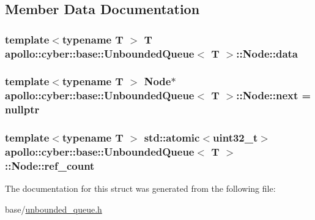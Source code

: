 \subsection{Member Data Documentation}
\hypertarget{structapollo_1_1cyber_1_1base_1_1UnboundedQueue_1_1Node_a9bc7d18c73019f923588336f91cba5df}{
\subsubsection[{data}]{\setlength{\rightskip}{0pt plus 5cm}template$<$typename T $>$ T {\bf apollo\-::cyber\-::base\-::\-Unbounded\-Queue}$<$ T $>$\-::Node\-::data}}\label{structapollo_1_1cyber_1_1base_1_1UnboundedQueue_1_1Node_a9bc7d18c73019f923588336f91cba5df}
\hypertarget{structapollo_1_1cyber_1_1base_1_1UnboundedQueue_1_1Node_a9431bfb8cc5ff8be4870a1456f36f8c3}{
\subsubsection[{next}]{\setlength{\rightskip}{0pt plus 5cm}template$<$typename T $>$ {\bf Node}$\ast$ {\bf apollo\-::cyber\-::base\-::\-Unbounded\-Queue}$<$ T $>$\-::Node\-::next = nullptr}}\label{structapollo_1_1cyber_1_1base_1_1UnboundedQueue_1_1Node_a9431bfb8cc5ff8be4870a1456f36f8c3}
\hypertarget{structapollo_1_1cyber_1_1base_1_1UnboundedQueue_1_1Node_a083b6184f84c240769267e0823b34d89}{
\subsubsection[{ref\-\_\-count}]{\setlength{\rightskip}{0pt plus 5cm}template$<$typename T $>$ std\-::atomic$<$uint32\-\_\-t$>$ {\bf apollo\-::cyber\-::base\-::\-Unbounded\-Queue}$<$ T $>$\-::Node\-::ref\-\_\-count}}\label{structapollo_1_1cyber_1_1base_1_1UnboundedQueue_1_1Node_a083b6184f84c240769267e0823b34d89}


The documentation for this struct was generated from the following file\-:\begin{DoxyCompactItemize}
\item 
base/\hyperlink{unbounded__queue_8h}{unbounded\-\_\-queue.\-h}\end{DoxyCompactItemize}
